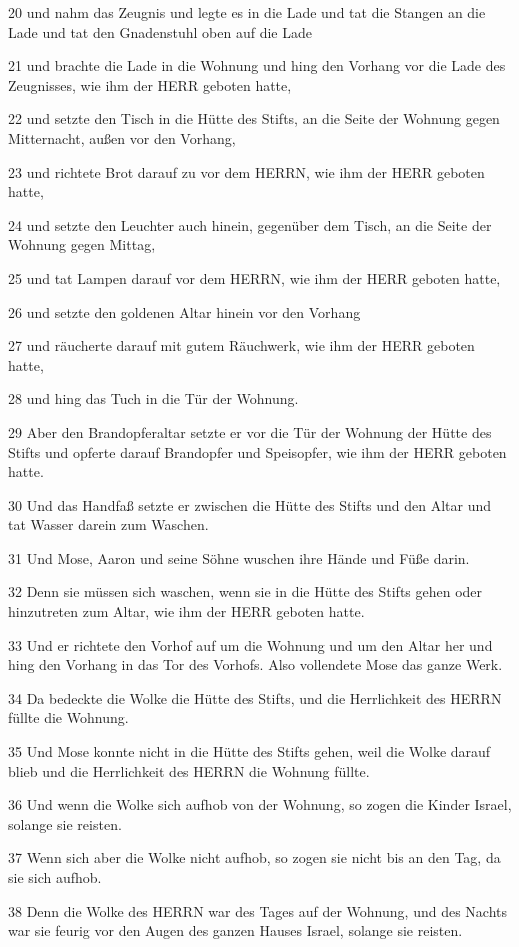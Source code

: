 \par 20 und nahm das Zeugnis und legte es in die Lade und tat die Stangen an die Lade und tat den Gnadenstuhl oben auf die Lade
\par 21 und brachte die Lade in die Wohnung und hing den Vorhang vor die Lade des Zeugnisses, wie ihm der HERR geboten hatte,
\par 22 und setzte den Tisch in die Hütte des Stifts, an die Seite der Wohnung gegen Mitternacht, außen vor den Vorhang,
\par 23 und richtete Brot darauf zu vor dem HERRN, wie ihm der HERR geboten hatte,
\par 24 und setzte den Leuchter auch hinein, gegenüber dem Tisch, an die Seite der Wohnung gegen Mittag,
\par 25 und tat Lampen darauf vor dem HERRN, wie ihm der HERR geboten hatte,
\par 26 und setzte den goldenen Altar hinein vor den Vorhang
\par 27 und räucherte darauf mit gutem Räuchwerk, wie ihm der HERR geboten hatte,
\par 28 und hing das Tuch in die Tür der Wohnung.
\par 29 Aber den Brandopferaltar setzte er vor die Tür der Wohnung der Hütte des Stifts und opferte darauf Brandopfer und Speisopfer, wie ihm der HERR geboten hatte.
\par 30 Und das Handfaß setzte er zwischen die Hütte des Stifts und den Altar und tat Wasser darein zum Waschen.
\par 31 Und Mose, Aaron und seine Söhne wuschen ihre Hände und Füße darin.
\par 32 Denn sie müssen sich waschen, wenn sie in die Hütte des Stifts gehen oder hinzutreten zum Altar, wie ihm der HERR geboten hatte.
\par 33 Und er richtete den Vorhof auf um die Wohnung und um den Altar her und hing den Vorhang in das Tor des Vorhofs. Also vollendete Mose das ganze Werk.
\par 34 Da bedeckte die Wolke die Hütte des Stifts, und die Herrlichkeit des HERRN füllte die Wohnung.
\par 35 Und Mose konnte nicht in die Hütte des Stifts gehen, weil die Wolke darauf blieb und die Herrlichkeit des HERRN die Wohnung füllte.
\par 36 Und wenn die Wolke sich aufhob von der Wohnung, so zogen die Kinder Israel, solange sie reisten.
\par 37 Wenn sich aber die Wolke nicht aufhob, so zogen sie nicht bis an den Tag, da sie sich aufhob.
\par 38 Denn die Wolke des HERRN war des Tages auf der Wohnung, und des Nachts war sie feurig vor den Augen des ganzen Hauses Israel, solange sie reisten.

